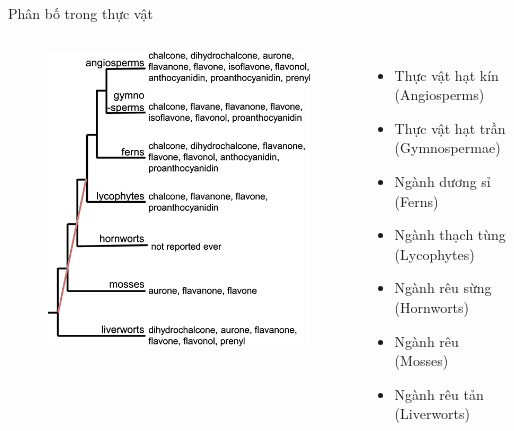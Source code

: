 \documentclass[11pt]{beamer}
\begin{document}
\begin{frame}{Phân bố trong thực vật}
\begin{columns}[T]
	\begin{figure}
		\centering
		\includegraphics[scale=0.33]{Flavonoid distribution.jpg}
	\end{figure}
	{\footnotesize
	\begin{itemize}
		\item Thực vật hạt kín (Angiosperms)
		\item Thực vật hạt trần (Gymnospermae)
		\item Ngành dương sỉ (Ferns)
		\item Ngành thạch tùng (Lycophytes)
		\item Ngành rêu sừng (Hornworts)
		\item Ngành rêu (Mosses)
		\item Ngành rêu tản (Liverworts)
	\end{itemize}
	}
\end{columns}
\end{frame}
\end{document}
